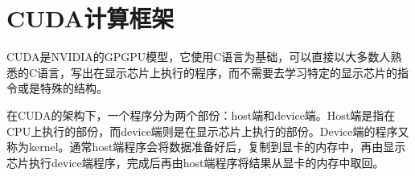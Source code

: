 
\chapter{CUDA计算框架}
  CUDA是NVIDIA的GPGPU模型，它使用C语言为基础，可以直接以大多数人熟悉的C语言，写出在显示芯片上执行的程序，而不需要去学习特定的显示芯片的指令或是特殊的结构。
  \par
  在CUDA的架构下，一个程序分为两个部份：host端和device端。Host端是指在CPU上执行的部份，而device端则是在显示芯片上执行的部份。Device端的程序又称为kernel。通常host端程序会将数据准备好后，复制到显卡的内存中，再由显示芯片执行device端程序，完成后再由host端程序将结果从显卡的内存中取回。
